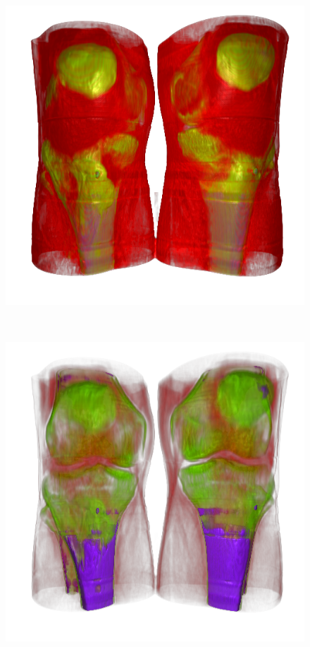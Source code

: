 \begin{figure}
	\centering
	\begin{minipage}{.4\textwidth}
		\includegraphics[width=1\linewidth]{images/CT-Knee_naive}
		\subcaption{}
	\end{minipage}~
	\begin{minipage}{.4\textwidth}
		\includegraphics[width=1\linewidth]{images/CT-Knee_naive_optimized_linesearch}
		\subcaption{}
	\end{minipage}
	

\end{figure}
